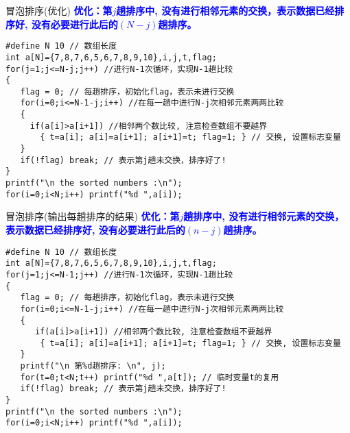 \begin{frame}{冒泡排序(优化)}
\textbf{\textcolor{blue}{优化：第$j$趟排序中, 没有进行相邻元素的交换，表示数据已经排序好, 没有必要进行此后的$(N-j)$趟排序。}}
\begin{lstlisting}
#define N 10 // 数组长度
int a[N]={7,8,7,6,5,6,7,8,9,10},i,j,t,flag;
for(j=1;j<=N-j;j++) //进行N-1次循环，实现N-1趟比较
{
   flag = 0; // 每趟排序，初始化flag，表示未进行交换
   for(i=0;i<=N-1-j;i++) //在每一趟中进行N-j次相邻元素两两比较
   {
     if(a[i]>a[i+1]) //相邻两个数比较, 注意检查数组不要越界 
       { t=a[i]; a[i]=a[i+1]; a[i+1]=t; flag=1; } // 交换, 设置标志变量
   }
   if(!flag) break; // 表示第j趟未交换，排序好了!
}
printf("\n the sorted numbers :\n");
for(i=0;i<N;i++) printf("%d ",a[i]);
\end{lstlisting}
\end{frame}

\begin{frame}{冒泡排序(输出每趟排序的结果)}
\textbf{\textcolor{blue}{优化：第$j$趟排序中, 没有进行相邻元素的交换，表示数据已经排序好, 没有必要进行此后的$(n-j)$趟排序。}}
\begin{lstlisting}
#define N 10 // 数组长度
int a[N]={7,8,7,6,5,6,7,8,9,10},i,j,t,flag;
for(j=1;j<=N-1;j++) //进行N-1次循环，实现N-1趟比较
{
   flag = 0; // 每趟排序，初始化flag，表示未进行交换
   for(i=0;i<=N-1-j;i++) //在每一趟中进行N-j次相邻元素两两比较
   {
      if(a[i]>a[i+1]) //相邻两个数比较, 注意检查数组不要越界 
       { t=a[i]; a[i]=a[i+1]; a[i+1]=t; flag=1; } // 交换, 设置标志变量
   }
   printf("\n 第%d趟排序: \n", j);
   for(t=0;t<N;t++) printf("%d ",a[t]); // 临时变量t的复用
   if(!flag) break; // 表示第j趟未交换，排序好了!
}
printf("\n the sorted numbers :\n");
for(i=0;i<N;i++) printf("%d ",a[i]);
\end{lstlisting}
\end{frame}